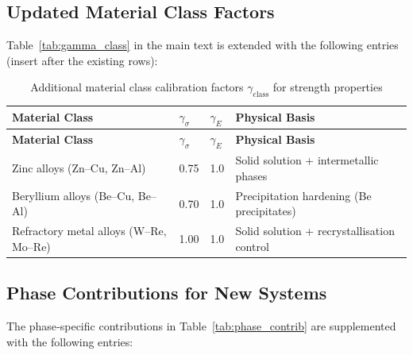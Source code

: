 \documentclass[12pt,a4paper]{article}
\begin{document}
	\subsection*{Updated Material Class Factors}
	Table~\ref{tab:gamma_class} in the main text is extended with the following entries (insert after the existing rows):
	
	\begin{longtable}{p{3.5cm} p{2.5cm} p{2.5cm} p{5cm}}
		\caption{Additional material class calibration factors $\gamma_{\text{class}}$ for strength properties}\label{tab:gamma_class_extended}\\
		\toprule
		\textbf{Material Class} & $\gamma_{\sigma}$ & $\gamma_{E}$ & \textbf{Physical Basis} \\
		\midrule
		\endfirsthead
		\toprule
		\textbf{Material Class} & $\gamma_{\sigma}$ & $\gamma_{E}$ & \textbf{Physical Basis} \\
		\midrule
		\endhead
		Zinc alloys (Zn–Cu, Zn–Al) & 0.75 & 1.0 & Solid solution + intermetallic phases \\
		Beryllium alloys (Be–Cu, Be–Al) & 0.70 & 1.0 & Precipitation hardening (Be precipitates) \\
		Refractory metal alloys (W–Re, Mo–Re) & 1.00 & 1.0 & Solid solution + recrystallisation control \\
		\bottomrule
	\end{longtable}
	
	\subsection*{Phase Contributions for New Systems}
	The phase‑specific contributions in Table~\ref{tab:phase_contrib} are supplemented with the following entries:
	
\end{document}
